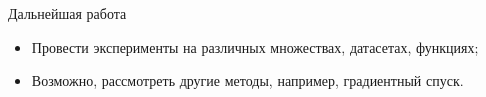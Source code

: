 \documentclass{beamer}
\begin{document}

\begin{frame}{Дальнейшая работа}

    \begin{itemize}
        \item Провести эксперименты на различных множествах, датасетах, функциях;
        \item Возможно, рассмотреть другие методы, например, градиентный спуск.
    \end{itemize}

\end{frame}

\end{document}
